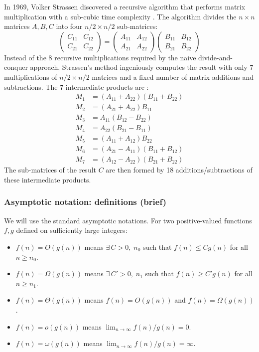\documentclass[11pt, a4paper, titlepage]{scrartcl}
\begin{document}
In 1969, Volker Strassen discovered a recursive algorithm that performs matrix multiplication with a sub-cubic time complexity \autocite{Khan2015}. The algorithm divides the \(n \times n\) matrices \(A, B, C\) into four \(n/2 \times n/2\) sub-matrices:
\[
\begin{pmatrix} C_{11} & C_{12} \\ C_{21} & C_{22} \end{pmatrix}
=
\begin{pmatrix} A_{11} & A_{12} \\ A_{21} & A_{22} \end{pmatrix}
\begin{pmatrix} B_{11} & B_{12} \\ B_{21} & B_{22} \end{pmatrix}
\]
Instead of the 8 recursive multiplications required by the naive divide-and-conquer approach, Strassen's method ingeniously computes the result with only 7 multiplications of \(n/2 \times n/2\) matrices and a fixed number of matrix additions and subtractions. The 7 intermediate products are \autocite{Khan2015}:
\begin{align*}
    M_1 &= (A_{11} + A_{22})(B_{11} + B_{22}) \\
    M_2 &= (A_{21} + A_{22})B_{11} \\
    M_3 &= A_{11}(B_{12} - B_{22}) \\
    M_4 &= A_{22}(B_{21} - B_{11}) \\
    M_5 &= (A_{11} + A_{12})B_{22} \\
    M_6 &= (A_{21} - A_{11})(B_{11} + B_{12}) \\
    M_7 &= (A_{12} - A_{22})(B_{21} + B_{22})
\end{align*}
The sub-matrices of the result \(C\) are then formed by 18 additions/subtractions of these intermediate products.

\subsubsection{Asymptotic notation: definitions (brief)}
We will use the standard asymptotic notations. For two positive-valued functions $f,g$ defined on sufficiently large integers:
\begin{itemize}
  \item $f(n)=O(g(n))$ means $\exists\, C>0,\; n_0$ such that $f(n)\le C g(n)$ for all $n\ge n_0$.
  \item $f(n)=\Omega(g(n))$ means $\exists\, C'>0,\; n_1$ such that $f(n)\ge C' g(n)$ for all $n\ge n_1$.
  \item $f(n)=\Theta(g(n))$ means $f(n)=O(g(n))$ and $f(n)=\Omega(g(n))$.
  \item $f(n)=o(g(n))$ means $\lim_{n\to\infty} f(n)/g(n)=0$.
  \item $f(n)=\omega(g(n))$ means $\lim_{n\to\infty} f(n)/g(n)=\infty$.
\end{itemize}
\end{document}
